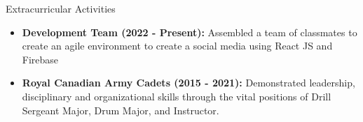 \documentclass[]{mcdowellcv}
\begin{document}
	\begin{cvsection}{Extracurricular Activities}
		\begin{cvsubsection}{}{}{}
			\begin{itemize}
				\item \textbf{Development Team (2022 - Present):} Assembled a team of classmates to create an agile environment to create a social media using React JS and Firebase
				\item \textbf{Royal Canadian Army Cadets (2015 - 2021):} Demonstrated leadership, disciplinary and organizational skills through the vital positions of Drill Sergeant Major, Drum Major, and Instructor.
			\end{itemize}
		\end{cvsubsection}
	\end{cvsection}
\end{document}

